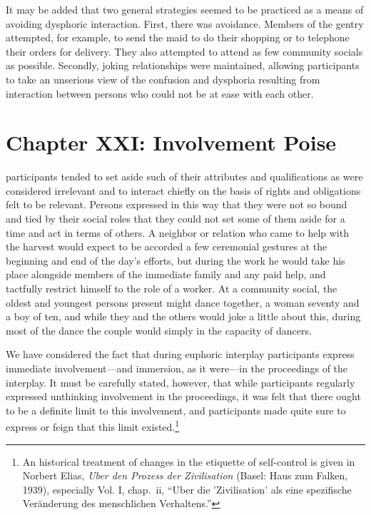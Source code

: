 \documentclass[openany,nobib]{tufte-book}
\let\oldchapter\chapter
\def\chapter{%
  \setcounter{footnote}{0}%
  \oldchapter
}
\begin{document}
It may be added that two general strategies seemed to be practiced as a
means of avoiding dysphoric interaction. First, there was avoidance.
Members of the gentry attempted, for example, to send the maid to do
their shopping or to telephone their orders for delivery. They also
attempted to attend as few community socials as possible. Secondly,
joking relationships were maintained, allowing participants to take an
unserious view of the confusion and dysphoria resulting from interaction
between persons who could not be at ease with each other.

\chapter[CHAPTER XXI: INVOLVEMENT POISE]{Chapter XXI: Involvement Poise}
\label{ch:Chapter XXI: Involvement Poise}

participants tended to set aside such of
their attributes and qualifications as were considered irrelevant and to
interact chiefly on the basis of rights and obligations felt to be
relevant. Persons expressed in this way that they were not so bound and
tied by their social roles that they could not set some of them aside
for a time and act in terms of others. A neighbor or relation who came
to help with the harvest would expect to be accorded a few ceremonial
gestures at the beginning and end of the day's efforts, but during the
work he would take his place alongside members of the immediate family
and any paid help, and tactfully restrict himself to the role of a
worker. At a community social, the oldest and youngest persons present
might dance together, a woman seventy and a boy of ten, and while they
and the others would joke a little about this, during most of the dance
the couple would simply in the capacity of dancers.

We have considered the fact that during euphoric interplay participants
express immediate involvement---and immersion, as it were---in the
proceedings of the interplay. It must be carefully stated, however, that
while participants regularly expressed unthinking involvement in the
proceedings, it was felt that there ought to be a definite limit to this
involvement, and participants made quite sure to express or feign that
this limit existed.\footnote{An historical treatment of changes in the
  etiquette of self-control is given in Norbert Elias, \emph{Uber den
  Prozess der Zivilisation} (Basel: Haus zum Falken, 1939), especially
  Vol. I, chap.~ii, ``Uber die 'Zivilisation' als eine spezifische
  Veränderung des menschlichen Verhaltens.''}
\end{document}
